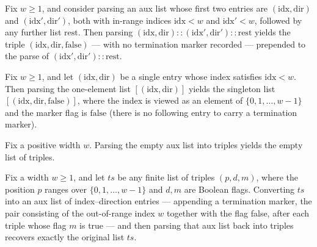 \begin{lemma}
\label{SwitchingLemma.parseAux_cons_nonmarker}
\leanok
{}
Fix $w \geq 1$, and consider parsing an aux list whose first two entries are
$(\mathrm{idx}, \mathrm{dir})$ and $(\mathrm{idx}', \mathrm{dir}')$, both with in-range
indices $\mathrm{idx} < w$ and $\mathrm{idx}' < w$, followed by any further list
$\mathrm{rest}$. Then parsing $(\mathrm{idx}, \mathrm{dir}) :: (\mathrm{idx}',
\mathrm{dir}') :: \mathrm{rest}$ yields the triple $(\mathrm{idx}, \mathrm{dir},
\mathrm{false})$ — with no termination marker recorded — prepended to the parse of
$(\mathrm{idx}', \mathrm{dir}') :: \mathrm{rest}$.
\end{lemma}

\begin{lemma}
\label{SwitchingLemma.parseAux_singleton}
\leanok
{}
Fix $w \ge 1$, and let $(\mathrm{idx}, \mathrm{dir})$ be a single entry whose index
satisfies $\mathrm{idx} < w$. Then parsing the one-element list $[(\mathrm{idx},
\mathrm{dir})]$ yields the singleton list $[(\mathrm{idx}, \mathrm{dir},
\mathrm{false})]$, where the index is viewed as an element of $\{0, 1, \dots, w-1\}$ and
the marker flag is $\mathrm{false}$ (there is no following entry to carry a termination
marker).
\end{lemma}

\begin{lemma}
\label{SwitchingLemma.parseAux_nil}
\leanok
{}
Fix a positive width $w$. Parsing the empty aux list into triples yields the empty list
of triples.
\end{lemma}

\begin{lemma}
\label{SwitchingLemma.parseAux_triplesToAux}
\leanok
{}
Fix a width $w \ge 1$, and let $ts$ be any finite list of triples $(p, d, m)$, where the
position $p$ ranges over $\{0, 1, \dots, w-1\}$ and $d, m$ are Boolean flags. Converting
$ts$ into an aux list of index–direction entries — appending a termination marker, the
pair consisting of the out-of-range index $w$ together with the flag false, after each
triple whose flag $m$ is true — and then parsing that aux list back into triples
recovers exactly the original list $ts$.
\end{lemma}

